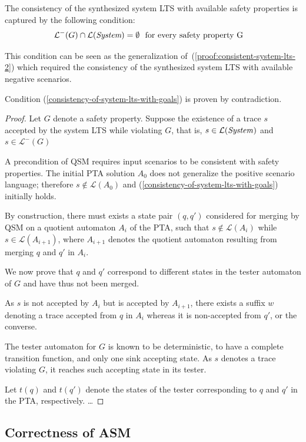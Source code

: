 The consistency of the synthesized system LTS with available safety properties is captured by the following condition:
\begin{align}
&\mathcal{L}^-(G) \cap \mathcal{L}(\emph{System}) = \emptyset \mbox{~~for every safety property~G}\label{consistency-of-system-lts-with-goals}
\end{align}

This condition can be seen as the generalization of~(\ref{proof:consistent-system-lts-2}) which required the consistency of the synthesized system LTS with available negative scenarios.

Condition (\ref{consistency-of-system-lts-with-goals}) is proven by contradiction.
\begin{proof}
Let $G$ denote a safety property. Suppose the existence of a trace $s$ accepted by the system LTS while violating $G$, that is, $s \in \mathcal{L}(\mbox{\emph{System}})$ and $s \in \mathcal{L}^-(G)$

A precondition of QSM requires input scenarios to be consistent with safety properties. The initial PTA solution $A_0$ does not generalize the positive scenario language; therefore $s \notin \mathcal{L}(A_0)$ and (\ref{consistency-of-system-lts-with-goals}) initially holds. 

By construction, there must exists a state pair $(q,q')$ considered for merging by QSM on a quotient automaton $A_i$ of the PTA, such that $s \notin \mathcal{L}(A_i)$ while $s \in \mathcal{L}(A_{i+1})$, where $A_{i+1}$ denotes the quotient automaton resulting from merging $q$ and $q'$ in $A_i$. 

We now prove that $q$ and $q'$ correspond to different states in the tester automaton of $G$ and have thus not been merged.

As $s$ is not accepted by $A_i$ but is accepted by $A_{i+1}$, there exists a suffix $w$ denoting a trace accepted from $q$ in $A_i$ whereas it is non-accepted from $q'$, or the converse. 

The tester automaton for $G$ is known to be deterministic, to have a complete transition function, and only one sink accepting state. As $s$ denotes a trace violating $G$, it reaches such accepting state in its tester. 

Let $t(q)$ and $t(q')$ denote the states of the tester corresponding to $q$ and $q'$ in the PTA, respectively.
\ldots
\end{proof}


\subsection{Correctness of ASM\label{subsection:correctness-of-asm}}

